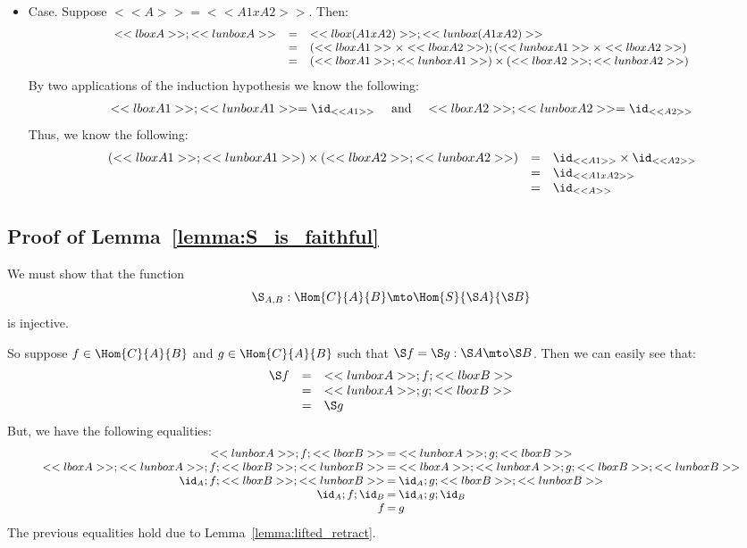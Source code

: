 \begin{itemize}
  \item[] Case. Suppose $<<A>> = <<A1 x A2>>$.  Then:
    \[\small
    \begin{array}{lll}
      <<lbox A>>;<<lunbox A>>
      & = & <<lbox (A1 x A2)>>;<<lunbox (A1 x A2)>>\\
      & = & (<<lbox A1>> \times <<lbox A2>>);(<<lunbox A1>> \times <<lbox A2>>)\\
      & = & (<<lbox A1>>;<<lunbox A1>>) \times (<<lbox A2>>;<<lunbox A2>>)\\
    \end{array}
    \]
    By two applications of the induction hypothesis we know the
    following:
    \[
    \begin{array}{lll}
      <<lbox A1>>;<<lunbox A1>> = \id_{<<A1>>} & \text{ and } & <<lbox A2>>;<<lunbox A2>> = \id_{<<A2>>}
    \end{array}
    \]
    Thus, we know the following:
    \[
    \begin{array}{lll}
      (<<lbox A1>>;<<lunbox A1>>) \times (<<lbox A2>>;<<lunbox A2>>)
      & = & \id_{<<A1>>} \times \id_{<<A2>>}\\
      & = & \id_{<<A1 x A2>>}\\
      & = & \id_{<<A>>}
    \end{array}
    \]
\end{itemize}

\subsection{Proof of Lemma~\ref{lemma:S_is_faithful}}
\label{subsec:proof_of_S_is_faithful}
We must show that the function
\[ \S_{A,B} : \Hom{C}{A}{B} \mto \Hom{S}{\S A}{\S B} \]
is injective.

So suppose $f \in \Hom{C}{A}{B}$ and $g \in \Hom{C}{A}{B}$ such that
$\S f = \S g : \S A \mto \S B$.  Then we can easily see that:
\[
\begin{array}{lll}
  \S f & = & <<lunbox A>>;f;<<lbox B>> \\
  & = & <<lunbox A>>;g;<<lbox B>>\\
  & = & \S g\\
\end{array}
\]
But, we have the following equalities:
\[\small
\setlength{\arraycolsep}{1px}
\begin{array}{rll}
  <<lunbox A>>;f;<<lbox B>> & = & <<lunbox A>>;g;<<lbox B>>\\
  <<lbox A>>;<<lunbox A>>;f;<<lbox B>>;<<lunbox B>> & = & <<lbox A>>;<<lunbox A>>;g;<<lbox B>>;<<lunbox B>>\\
  \id_A;f;<<lbox B>>;<<lunbox B>> & = & \id_A;g;<<lbox B>>;<<lunbox B>>\\
  \id_A;f;\id_B & = & \id_A;g;\id_B\\
  f & = & g\\
\end{array}
\]
The previous equalities hold due to
Lemma~\ref{lemma:lifted_retract}.

